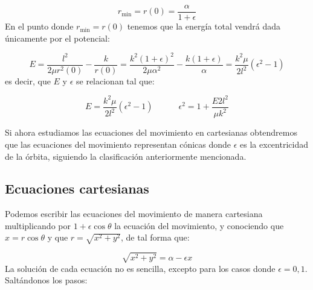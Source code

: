 \documentclass[12pt,a4paper]{book}
\begin{document}
$$ r_{\mathrm{min}} = r(0) =  \dfrac{\alpha}{1+\epsilon}$$
En el punto donde $r_{\mathrm{min}}=r(0)$ tenemos que la energía total vendrá dada únicamente por el potencial:

$$ E = \dfrac{l^2}{2 \mu r^2(0)} - \dfrac{k}{r(0)} = \dfrac{k^2 (1+\epsilon)^2}{2 \mu \alpha^2} - \dfrac{k (1+\epsilon)}{\alpha} = \dfrac{k^2 \mu}{2 l^2} (\epsilon^2-1) $$
es decir, que $E$ y $\epsilon$ se relacionan tal que:

\begin{equation}
E = \dfrac{k^2 \mu}{2 l^2} (\epsilon^2-1) \quad \quad \quad \epsilon^2 = 1 + \dfrac{E 2 l^2}{\mu k^2}
\end{equation}

Si ahora estudiamos las ecuaciones del movimiento en cartesianas obtendremos que las ecuaciones del movimiento representan cónicas donde $\epsilon$ es la excentricidad de la órbita, siguiendo la clasificación anteriormente mencionada.

\subsection{Ecuaciones cartesianas}

Podemos escribir las ecuaciones del movimiento de manera cartesiana multiplicando por $1+\epsilon \cos \theta$ la ecuación del movimiento, y conociendo que $x=r \cos \theta$ y que $r=\sqrt{x^2+y^2}$, de tal forma que:

\begin{equation}
\sqrt{x^2+y^2} = \alpha - \epsilon x \label{Ec:2.2.4.01}
\end{equation}
La solución de cada ecuación no es sencilla, excepto para los casos donde $\epsilon = 0,1$. Saltándonos los pasos:
\end{document}
